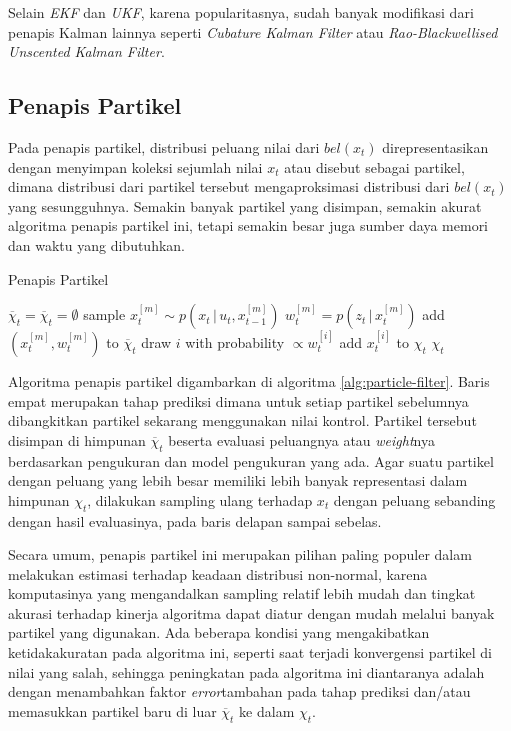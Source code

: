 Selain \textit{EKF} dan \textit{UKF}, karena popularitasnya, sudah banyak modifikasi dari penapis Kalman lainnya seperti \textit{Cubature Kalman Filter} atau \textit{Rao-Blackwellised Unscented Kalman Filter}.

\subsection{Penapis Partikel}

Pada penapis partikel, distribusi peluang nilai dari $bel(x_t)$ direpresentasikan dengan menyimpan koleksi sejumlah nilai $x_t$ atau disebut sebagai partikel, dimana distribusi dari partikel tersebut mengaproksimasi distribusi dari $bel(x_t)$ yang sesungguhnya. Semakin banyak partikel yang disimpan, semakin akurat algoritma penapis partikel ini, tetapi semakin besar juga sumber daya memori dan waktu yang dibutuhkan.

\begin{algorithm}
    \caption{Penapis Partikel}
    \label{alg:particle-filter}
    \begin{algorithmic}[1]
        \State $\overline{\chi}_t= \overline{\chi}_t = \emptyset$
        \State sample $x_t^{[m]} \sim p(x_t \,|\, u_t, x_{t-1}^{[m]})$
        \State $w_t^{[m]} = p(z_t \,|\, x_t^{[m]})$
        \State add $(x_t^{[m]}, w_t^{[m]})$ to $\overline{\chi}_t$
        \EndFor
        \State draw $i$ with probability $\propto w_t^{[i]}$
        \State add $x_t^{[i]}$ to $\chi_t$
        \EndFor
        \State \Return $\chi_t$
        \EndFunction
    \end{algorithmic}
\end{algorithm}

Algoritma penapis partikel digambarkan di algoritma \ref{alg:particle-filter}. Baris empat merupakan tahap prediksi dimana untuk setiap partikel sebelumnya dibangkitkan partikel sekarang menggunakan nilai kontrol. Partikel tersebut disimpan di himpunan $\overline{\chi}_t$ beserta evaluasi peluangnya  atau \textit{weight}nya berdasarkan pengukuran dan model pengukuran yang ada. Agar suatu partikel dengan peluang yang lebih besar memiliki lebih banyak representasi dalam himpunan $\chi_t$, dilakukan sampling ulang terhadap $x_t$ dengan peluang sebanding dengan hasil evaluasinya, pada baris delapan sampai sebelas.

Secara umum, penapis partikel ini merupakan pilihan paling populer dalam melakukan estimasi terhadap keadaan distribusi non-normal, karena komputasinya yang mengandalkan sampling relatif lebih mudah dan tingkat akurasi terhadap kinerja algoritma dapat diatur dengan mudah melalui banyak partikel yang digunakan. Ada beberapa kondisi yang mengakibatkan ketidakakuratan pada algoritma ini, seperti saat terjadi konvergensi partikel di nilai yang salah, sehingga peningkatan pada algoritma ini diantaranya adalah dengan menambahkan faktor \textit{error}tambahan pada tahap prediksi dan/atau memasukkan partikel baru di luar $\overline{\chi}_t$ ke dalam $\chi_t$.

